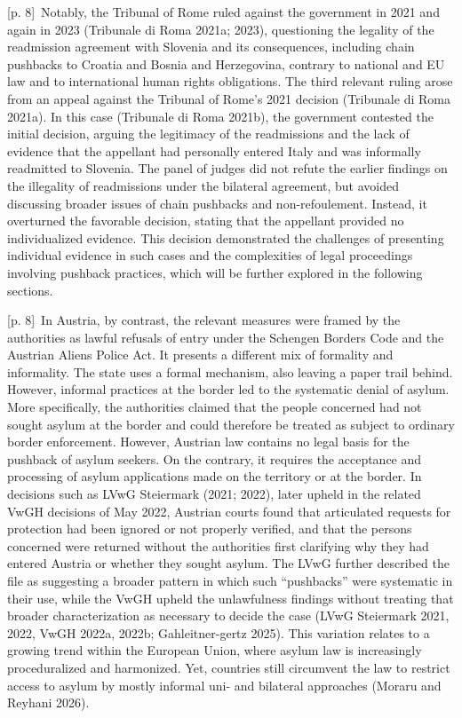 \documentclass[10pt,a4paper]{article}
\begin{document}
{\scriptsize\color{gray} [p. 8]}\ Notably, the Tribunal of Rome ruled against the government in 2021 and again in 2023 (Tribunale di Roma 2021a; 2023), questioning the legality of the readmission agreement with Slovenia and its consequences, including chain pushbacks to Croatia and Bosnia and Herzegovina, contrary to national and EU law and to international human rights obligations. The third relevant ruling arose from an appeal against the Tribunal of Rome’s 2021 decision (Tribunale di Roma 2021a). In this case (Tribunale di Roma 2021b), the government contested the initial decision, arguing the legitimacy of the readmissions and the lack of evidence that the appellant had personally entered Italy and was informally readmitted to Slovenia. The panel of judges did not refute the earlier findings on the illegality of readmissions under the bilateral agreement, but avoided discussing broader issues of chain pushbacks and non-refoulement. Instead, it overturned the favorable decision, stating that the appellant provided no individualized evidence. This decision demonstrated the challenges of presenting individual evidence in such cases and the complexities of legal proceedings involving pushback practices, which will be further explored in the following sections.\par
{\scriptsize\color{gray} [p. 8]}\ In Austria, by contrast, the relevant measures were framed by the authorities as lawful refusals of entry under the Schengen Borders Code and the Austrian Aliens Police Act. It presents a different mix of formality and informality. The state uses a formal mechanism, also leaving a paper trail behind. However, informal practices at the border led to the systematic denial of asylum. More specifically, the authorities claimed that the people concerned had not sought asylum at the border and could therefore be treated as subject to ordinary border enforcement. However, Austrian law contains no legal basis for the pushback of asylum seekers. On the contrary, it requires the acceptance and processing of asylum applications made on the territory or at the border. In decisions such as LVwG Steiermark (2021; 2022), later upheld in the related VwGH decisions of May 2022, Austrian courts found that articulated requests for protection had been ignored or not properly verified, and that the persons concerned were returned without the authorities first clarifying why they had entered Austria or whether they sought asylum. The LVwG further described the file as suggesting a broader pattern in which such “pushbacks” were systematic in their use, while the VwGH upheld the unlawfulness findings without treating that broader characterization as necessary to decide the case (LVwG Steiermark 2021, 2022, VwGH 2022a, 2022b; Gahleitner-gertz 2025). This variation relates to a growing trend within the European Union, where asylum law is increasingly proceduralized and harmonized. Yet, countries still circumvent the law to restrict access to asylum by mostly informal uni- and bilateral approaches (Moraru and Reyhani 2026).\par
\end{document}
